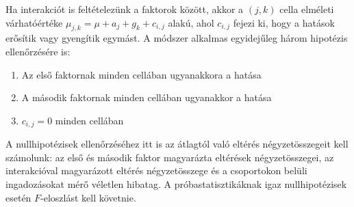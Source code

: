 Ha interakciót is feltételezünk a faktorok között, akkor a $(j,k)$ cella elméleti várhatóértéke $\mu_{j,k} = \mu + a_j+g_k + c_{i,j}$ alakú, ahol $c_{i,j}$ fejezi ki, hogy a hatások erősítik vagy gyengítik egymást. A módszer alkalmas egyidejűleg három hipotézis ellenőrzésére is:
\begin{enumerate}
\item Az első faktornak minden cellában ugyanakkora a hatása
\item A második faktornak minden cellában ugyanakkor a hatása
\item $c_{i,j}=0$ minden cellában
\end{enumerate}

A nullhipotézisek ellenőrzéséhez itt is az átlagtól való eltérés négyzetösszegeit kell számolunk: az első és második faktor magyarázta eltérések négyzetösszegei, az interakcióval magyarázott eltérés négyzetösszege és a csoportokon belüli ingadozásokat mérő véletlen hibatag. A próbastatisztikáknak igaz nullhipotézisek esetén $F$-eloszlást kell követnie.
